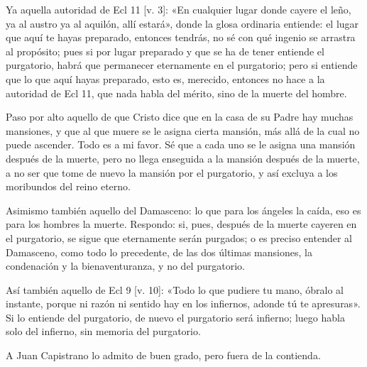 Ya aquella autoridad de Ecl 11 [v. 3]: «En cualquier lugar donde cayere el leño, ya al austro ya al aquilón, allí estará», donde la glosa ordinaria entiende: el lugar que aquí te hayas preparado, entonces tendrás, no sé con qué ingenio se arrastra al propósito; pues si por lugar preparado y que se ha de tener entiende el purgatorio, habrá que permanecer eternamente en el purgatorio; pero si entiende que lo que aquí hayas preparado, esto es, merecido, entonces no hace a la autoridad de Ecl 11, que nada habla del mérito, sino de la muerte del hombre.

Paso por alto aquello de que Cristo dice que en la casa de su Padre hay muchas mansiones, y que al que muere se le asigna cierta mansión, más allá de la cual no puede ascender. Todo es a mi favor. Sé que a cada uno se le asigna una mansión después de la muerte, pero no llega enseguida a la mansión después de la muerte, a no ser que tome de nuevo la mansión por el purgatorio, y así excluya a los moribundos del reino eterno.

Asimismo también aquello del Damasceno: lo que para los ángeles la caída, eso es para los hombres la muerte. Respondo: si, pues, después de la muerte cayeren en el purgatorio, se sigue que eternamente serán purgados; o es preciso entender al Damasceno, como todo lo precedente, de las dos últimas mansiones, la condenación y la bienaventuranza, y no del purgatorio.

Así también aquello de Ecl 9 [v. 10]: «Todo lo que pudiere tu mano, óbralo al instante, porque ni razón ni sentido hay en los infiernos, adonde tú te apresuras». Si lo entiende del purgatorio, de nuevo el purgatorio será infierno; luego habla solo del infierno, sin memoria del purgatorio.

A Juan Capistrano lo admito de buen grado, pero fuera de la contienda.

